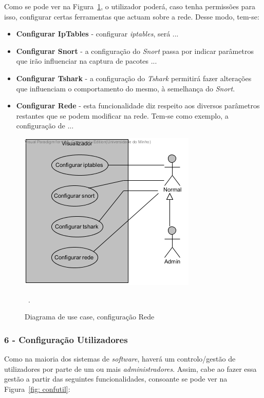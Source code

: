 Como se pode ver na Figura~\ref{fig: confrede}, o utilizador poderá, caso tenha permissões para isso, configurar certas ferramentas que actuam sobre a rede. Desse modo, tem-se:

\begin{itemize}
 \item \textbf{Configurar IpTables} - configurar \emph{iptables}, será ...
 \item \textbf{Configurar Snort} - a configuração do \emph{Snort} passa por indicar parâmetros que irão influenciar na captura de pacotes ...
 \item \textbf{Configurar Tshark} - a configuração do \emph{Tshark} permitirá fazer alterações que influenciam o comportamento do mesmo, à semelhança do \emph{Snort}.
 \item \textbf{Configurar Rede} - esta funcionalidade diz respeito aos diversos parâmetros restantes que se podem modificar na rede. Tem-se como exemplo, a configuração de ...
\end{itemize}

\begin{figure}[!htb]
	\centering
	\includegraphics[scale=0.80]{images/ucs/ConfRede}
	\caption {Diagrama de use case, configuração Rede}~\label{fig: confrede}.
\end{figure}
\pagebreak

\subsubsection{\textbf{6 - Configuração Utilizadores}}

Como na maioria dos sistemas de \emph{software}, haverá um controlo/gestão de utilizadores por parte de um ou mais \emph{administradores}. Assim, cabe ao \admini fazer essa gestão a partir das seguintes funcionalidades, consoante se pode ver na Figura~\ref{fig: confutil}:

